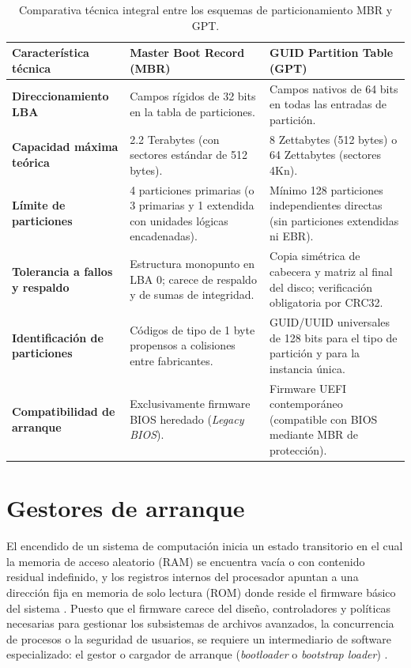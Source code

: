 \documentclass[12pt]{article}
\begin{document}
\begin{table}[!t]
\centering
\small
\renewcommand{\arraystretch}{1.1}
\renewcommand{\tabularxcolumn}[1]{m{#1}}
\setlength{\emergencystretch}{1.5em}
\caption{Comparativa técnica integral entre los esquemas de particionamiento MBR y GPT.}
\label{tab:comparativaMbrGpt}
\begin{tabularx}{\textwidth}{>{\centering\arraybackslash}m{3.5cm} X X}
\toprule
\textbf{Característica técnica} & \textbf{Master Boot Record (MBR)} & \textbf{GUID Partition Table (GPT)} \\
\midrule
\textbf{Direccionamiento LBA} & Campos rígidos de 32 bits en la tabla de particiones. & Campos nativos de 64 bits en todas las entradas de partición. \\
\addlinespace
\textbf{Capacidad máxima teórica} & 2.2 Terabytes (con sectores estándar de 512 bytes). & 8 Zettabytes (512 bytes) o 64 Zettabytes (sectores 4Kn). \\
\addlinespace
\textbf{Límite de particiones} & 4 particiones primarias (o 3 primarias y 1 extendida con unidades lógicas encadenadas). & Mínimo 128 particiones independientes directas (sin particiones extendidas ni EBR). \\
\addlinespace
\textbf{Tolerancia a fallos y respaldo} & Estructura monopunto en LBA 0; carece de respaldo y de sumas de integridad. & Copia simétrica de cabecera y matriz al final del disco; verificación obligatoria por CRC32. \\
\addlinespace
\textbf{Identificación de particiones} & Códigos de tipo de 1 byte propensos a colisiones entre fabricantes. & GUID/UUID universales de 128 bits para el tipo de partición y para la instancia única. \\
\addlinespace
\textbf{Compatibilidad de arranque} & Exclusivamente firmware BIOS heredado (\textit{Legacy BIOS}). & Firmware UEFI contemporáneo (compatible con BIOS mediante MBR de protección). \\
\bottomrule
\end{tabularx}
\end{table}

\section{Gestores de arranque}
\label{sec:gestoresArranque}

El encendido de un sistema de computación inicia un estado transitorio en el cual la memoria de acceso aleatorio (RAM) se encuentra vacía o con contenido residual indefinido, y los registros internos del procesador apuntan a una dirección fija en memoria de solo lectura (ROM) donde reside el firmware básico del sistema \parencite[\S 2.4, p.\ 64]{silberschatz2006fundamentos}. Puesto que el firmware carece del diseño, controladores y políticas necesarias para gestionar los subsistemas de archivos avanzados, la concurrencia de procesos o la seguridad de usuarios, se requiere un intermediario de software especializado: el gestor o cargador de arranque (\textit{bootloader} o \textit{bootstrap loader}) \parencite[\S 12.5.2, p.\ 419]{silberschatz2006fundamentos}.
\end{document}
